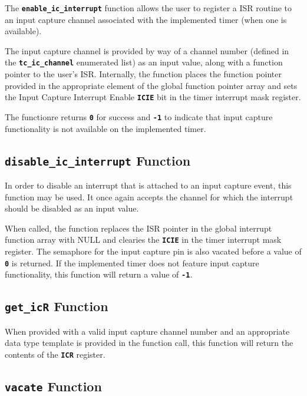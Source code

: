 \documentclass[a4paper, oneside, 11pt, titlepage, onecolumn, openright]{report}
\begin{document}
			The \textbf{\texttt{enable\_ic\_interrupt}} function allows the user to register a ISR routine to an input capture channel associated with the implemented timer (when one is available).
			
			The input capture channel is provided by way of a channel number (defined in the \textbf{\texttt{tc\_ic\_channel}} enumerated list) as an input value, along with a function pointer to the user's ISR.			
			Internally, the function places the function pointer provided in the appropriate element of the global function pointer array and sets the Input Capture Interrupt Enable \textbf{\texttt{ICIE}} bit in the timer interrupt mask register.
			
			The functionre returns \textbf{\texttt{0}} for success and \textbf{\texttt{-1}} to indicate that input capture functionality is not available on the implemented timer.	
			
\subsection{\textbf{\texttt{disable\_ic\_interrupt}} Function}
			\label{ss:HALtcdisable_ic_interruptFunction}
			
			In order to disable an interrupt that is attached to an input capture event, this function may be used. It once again accepts the channel for which the interrupt should be disabled as an input value.
			
			When called, the function replaces the ISR pointer in the global interrupt function array with NULL and clearies the \textbf{\texttt{ICIE}} in the timer interrupt mask register. The semaphore for the input capture pin is also vacated before a value of \textbf{\texttt{0}} is returned. If the implemented timer does not feature input capture functionality, this function will return a value of \textbf{\texttt{-1}}.
			
\subsection{\textbf{\texttt{get\_icR}} Function}
			\label{ss:HALtcget_icR_interruptFunction}
			
			When provided with a valid input capture channel number and an appropriate data type template is provided in the function call, this function will return the contents of the \textbf{\texttt{ICR}} register.	
			
\subsection{\textbf{\texttt{vacate}} Function}
			\label{ss:HALtcvacateFunction}
			
\end{document}
